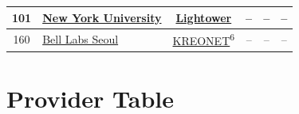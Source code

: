 \begin{small}
\begin{center}
\begin{longtable}{|c|c|c|c|c|c|}
 101 & \multicolumn{1}{|l|}{\index{New York University}\index{Site!New York University}\hyperref[sec:NYU]{New York University}} & \href{http://www.lightower.com}{Lightower} & – & – & – \\ \hline
 160 & \multicolumn{1}{|l|}{\index{Bell Labs Seoul}\index{Site!Bell Labs Seoul}\hyperref[sec:BLS]{Bell Labs Seoul}} & \href{http://www.kreonet.net}{KREONET}\textsuperscript{6} & – & – & – \\ \hline
\end{longtable}
\end{center}
\end{small}




\chapter{Provider Table}
\label{cha:Providers}


